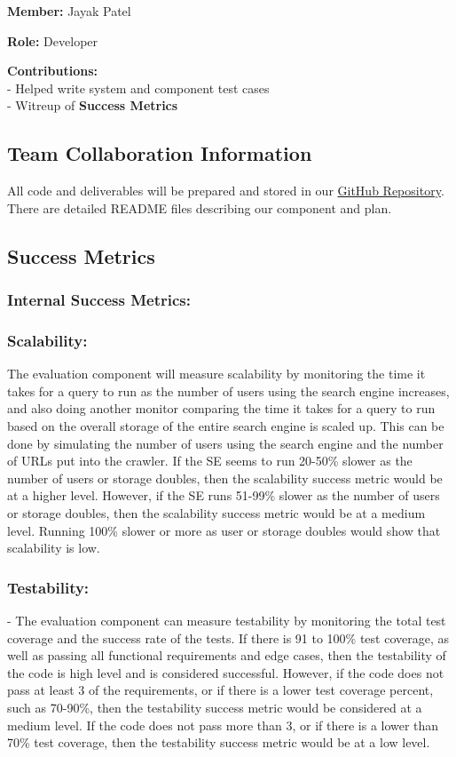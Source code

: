 \textbf{Member:} Jayak Patel

\smallskip

\textbf{Role:} Developer

\smallskip

\textbf{Contributions:} \\
- Helped write system and component test cases \\
- Witreup of \textbf{Success Metrics}


\subsection*{Team Collaboration Information}
All code and deliverables will be prepared and stored in our \href{https://github.com/justinottesen/LSPT-Evaluation}{GitHub Repository}. There are detailed README files describing our component and plan.

\subsection*{Success Metrics}
\subsubsection*{Internal Success Metrics:}
\medskip
\subsubsection*{Scalability:}
The evaluation component will measure scalability by monitoring the time it takes
for a query to run as the number of users using the search engine increases, and 
also doing another monitor comparing the time it takes for a query to run based on 
the overall storage of the entire search engine is scaled up. This can be done by 
simulating the number of users using the search engine and the number of URLs put 
into the crawler. If the SE seems to run 20-50\% slower as the number of users or 
storage doubles, then the scalability success metric would be at a higher level. 
However, if the SE runs 51-99\% slower as the number of users or storage doubles, 
then the scalability success metric would be at a medium level. Running 100\% 
slower or more as user or storage doubles would show that scalability is low. 

\smallskip

\subsubsection*{Testability:}
- The evaluation component can measure testability by monitoring the total test 
coverage and the success rate of the tests. If there is 91 to 100\% test coverage, 
as well as passing all functional requirements and edge cases, then the 
testability of the code is high level and is considered successful. However, if 
the code does not pass at least 3 of the requirements, or if there is a lower test 
coverage percent, such as 70-90\%, then the testability success metric would be 
considered at a medium level. If the code does not pass more than 3, or if there 
is a lower than 70\% test coverage, then the testability success metric would be 
at a low level.

